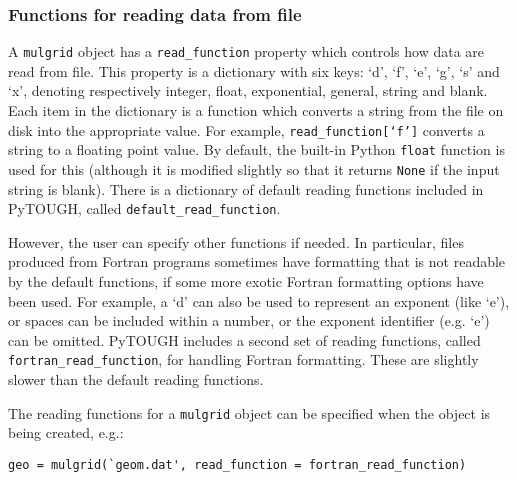 \subsubsection{Functions for reading data from file}

A \texttt{mulgrid} object has a \texttt{read\_function} property which controls how data are read from file.  This property is a dictionary with six keys: `d', `f', `e', `g', `s' and `x', denoting respectively integer, float, exponential, general, string and blank.  Each item in the dictionary is a function which converts a string from the file on disk into the appropriate value.  For example, \texttt{read\_function[`f']} converts a string to a floating point value.  By default, the built-in Python \texttt{float} function is used for this (although it is modified slightly so that it returns \texttt{None} if the input string is blank).  There is a dictionary of default reading functions included in PyTOUGH, called \texttt{default\_read\_function}.

However, the user can specify other functions if needed.  In particular, files produced from Fortran programs sometimes have formatting that is not readable by the default functions, if some more exotic Fortran formatting options have been used.   For example, a `d' can also be used to represent an exponent (like `e'), or spaces can be included within a number, or the exponent identifier (e.g. `e') can be omitted.  PyTOUGH includes a second set of reading functions, called \texttt{fortran\_read\_function}, for handling Fortran formatting.  These are slightly slower than the default reading functions.

The reading functions for a \texttt{mulgrid} object can be specified when the object is being created, e.g.:

\begin{verbatim}
geo = mulgrid(`geom.dat', read_function = fortran_read_function)
\end{verbatim}


